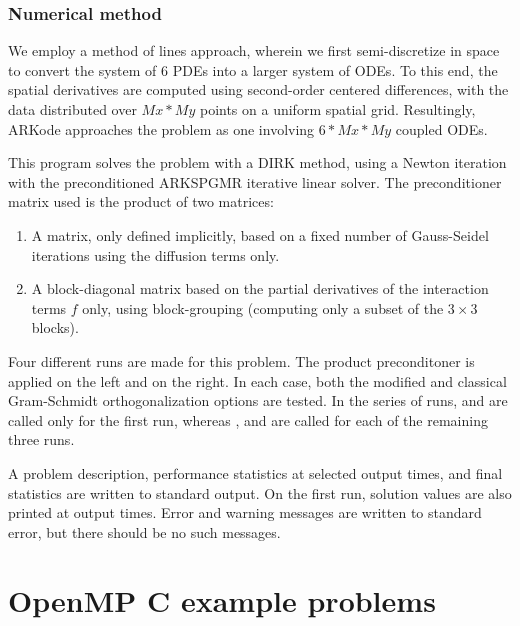 \documentclass[letterpaper,10pt,english]{sphinxmanual}
\begin{document}
\subsection{Numerical method}
\label{c_serial:id31}
We employ a method of lines approach, wherein we first
semi-discretize in space to convert the system of 6 PDEs into a larger
system of ODEs.  To this end, the spatial derivatives are computed
using second-order centered differences, with the data distributed
over \(Mx*My\) points on a uniform spatial grid.  Resultingly, ARKode
approaches the problem as one involving \(6*Mx*My\) coupled ODEs.

This program solves the problem with a DIRK method, using a Newton
iteration with the preconditioned ARKSPGMR iterative linear solver.
The preconditioner matrix used is the product of two matrices:
\begin{enumerate}
\item {} 
A matrix, only defined implicitly, based on a fixed number of
Gauss-Seidel iterations using the diffusion terms only.

\item {} 
A block-diagonal matrix based on the partial derivatives of the
interaction terms \(f\) only, using block-grouping (computing
only a subset of the \(3\times3\) blocks).

\end{enumerate}

Four different runs are made for this problem.  The product
preconditoner is applied on the left and on the right.  In each case,
both the modified and classical Gram-Schmidt orthogonalization options
are tested.  In the series of runs,  and 
are called only for the first run, whereas ,
 and  are called for each
of the remaining three runs.

A problem description, performance statistics at selected output
times, and final statistics are written to standard output.  On the
first run, solution values are also printed at output times.  Error
and warning messages are written to standard error, but there should
be no such messages.


\chapter{OpenMP C example problems}
\label{c_openmp:openmp-c}\label{c_openmp::doc}\label{c_openmp:openmp-c-example-problems}
\end{document}

